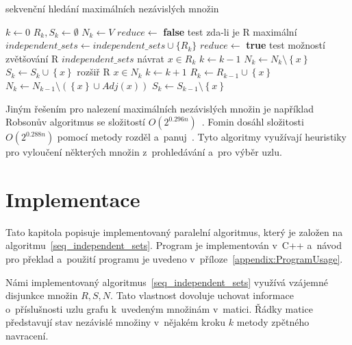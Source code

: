 \documentclass[12pt]{article}
\newcommand{\setHelper}[1]{\left\lbrace #1 \right\rbrace}
\begin{document}
\begin{algorithm}[H]
\caption{sekvenční hledání maximálních nezávislých množin}
\label{seq_independent_sets}
\begin{algorithmic}
\State $k \leftarrow 0$
\State $R_k, S_k \leftarrow \emptyset$
\State $N_k \leftarrow V$
  \State $reduce \leftarrow$ \textbf{false}
  \State \Comment test zda-li je R maximální                           
    \State $independent\_sets \leftarrow independent\_sets \cup \{R_k\}$
    \State $reduce \leftarrow$ \textbf{true}
  \EndIf    
  \State \Comment test možností zvětšování R
      \State \Return $independent\_sets$
    \EndIf
    \State \Comment návrat
    \State $x \in R_k$
    \State $k \leftarrow k - 1$
    \State $N_k \leftarrow N_k \setminus \setHelper{x}$
    \State $S_k \leftarrow S_k \cup \setHelper{x}$   
  \Else
    \State \Comment rozšiř R
    \State $x \in N_k$
    \State $k \leftarrow k+1$
    \State $R_k \leftarrow R_{k-1} \cup \setHelper{x}$    
    \State $N_k \leftarrow N_{k-1} \setminus (\setHelper{x} \cup Adj(x))$
    \State $S_k \leftarrow S_{k-1} \setminus \setHelper{x}$     
  \EndIf
\EndWhile
\EndFunction
\end{algorithmic}
\end{algorithm}


Jiným řešením pro nalezení maximálních nezávislých množin je například Robsonův algoritmus se složitostí \(O(2^{0.296n})\)~\cite{robson}. Fomin dosáhl složitosti \(O(2^{0.288n})\) pomocí metody rozděl a~panuj~\cite{fomin}. Tyto algoritmy využívají heuristiky pro vyloučení některých množin z~prohledávání a~pro výběr uzlu.  

\section{Implementace}
Tato kapitola popisuje implementovaný paralelní algoritmus, který je založen na algoritmu~\ref{seq_independent_sets}. Program je implementován v~C++ a~návod pro překlad a~použití programu je uvedeno v~příloze~\ref{appendix:ProgramUsage}.

Námi implementovaný algoritmus~\ref{seq_independent_sets} využívá vzájemné disjunkce množin $R,S,N$. Tato vlastnost dovoluje uchovat informace o~příslušnosti uzlu grafu k~uvedeným množinám v~matici. Řádky matice představují stav nezávislé množiny v~nějakém kroku $k$ metody zpětného navracení. 
                                                           
\end{document}
